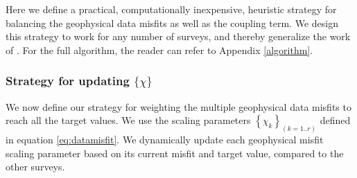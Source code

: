 \documentclass[extra, mreferee]{gji_joint} %
\begin{document}
Here we define a practical, computationally inexpensive, heuristic strategy for balancing the geophysical data misfits as well as the coupling term. We design this strategy to work for any number of surveys, and thereby generalize the work of \citet{Lelievre2012}. For the full algorithm, the reader can refer to Appendix \ref{algorithm}.

\subsubsection{Strategy for updating $\{\chi\}$}

We now define our strategy for weighting the multiple geophysical data misfits to reach all the target values. We use the scaling parameters $\left\{\chi_k\right\}_{(k=1..r)}$ defined in equation \eqref{eq:datamisfit}. We dynamically update each geophysical misfit scaling parameter based on its current misfit and target value, compared to the other surveys.

\end{document}
